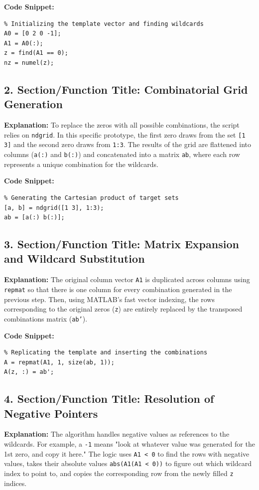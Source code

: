 \textbf{Code Snippet:}
\begin{lstlisting}
% Initializing the template vector and finding wildcards
A0 = [0 2 0 -1];
A1 = A0(:);
z = find(A1 == 0);
nz = numel(z);
\end{lstlisting}

\subsection{2. Section/Function Title: Combinatorial Grid Generation}
\textbf{Explanation:} 
To replace the zeros with all possible combinations, the script relies on \texttt{ndgrid}. In this specific prototype, the first zero draws from the set \texttt{[1 3]} and the second zero draws from \texttt{1:3}. The results of the grid are flattened into columns (\texttt{a(:)} and \texttt{b(:)}) and concatenated into a matrix \texttt{ab}, where each row represents a unique combination for the wildcards.

\textbf{Code Snippet:}
\begin{lstlisting}
% Generating the Cartesian product of target sets
[a, b] = ndgrid([1 3], 1:3);
ab = [a(:) b(:)];
\end{lstlisting}

\subsection{3. Section/Function Title: Matrix Expansion and Wildcard Substitution}
\textbf{Explanation:} 
The original column vector \texttt{A1} is duplicated across columns using \texttt{repmat} so that there is one column for every combination generated in the previous step. Then, using MATLAB's fast vector indexing, the rows corresponding to the original zeros (\texttt{z}) are entirely replaced by the transposed combinations matrix (\texttt{ab'}).

\textbf{Code Snippet:}
\begin{lstlisting}
% Replicating the template and inserting the combinations
A = repmat(A1, 1, size(ab, 1));
A(z, :) = ab';
\end{lstlisting}

\subsection{4. Section/Function Title: Resolution of Negative Pointers}
\textbf{Explanation:} 
The algorithm handles negative values as references to the wildcards. For example, a \texttt{-1} means "look at whatever value was generated for the 1st zero, and copy it here." The logic uses \texttt{A1 < 0} to find the rows with negative values, takes their absolute values \texttt{abs(A1(A1 < 0))} to figure out which wildcard index to point to, and copies the corresponding row from the newly filled \texttt{z} indices.

